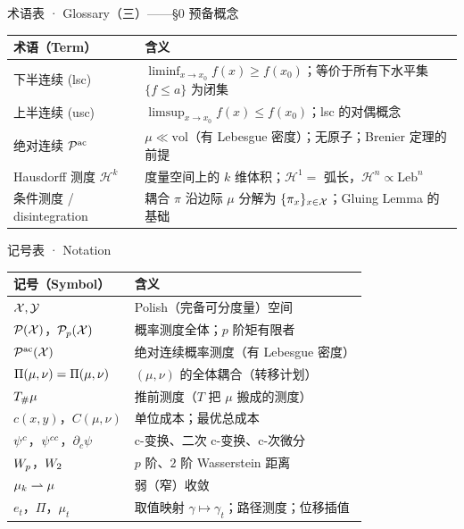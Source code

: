 \begin{frame}{术语表 · Glossary（三）——§0 预备概念}
  \begin{center}\small
  \begin{tabular}{ll}
    \toprule
    \textbf{术语（Term）} & \textbf{含义} \\
    \midrule
    下半连续 (lsc) & $\liminf_{x\to x_0}f(x)\ge f(x_0)$；等价于所有下水平集 $\{f\le a\}$ 为闭集 \\
    上半连续 (usc) & $\limsup_{x\to x_0}f(x)\le f(x_0)$；lsc 的对偶概念 \\
    绝对连续 $\mathcal{P}^{\mathrm{ac}}$ & $\mu\ll\mathrm{vol}$（有 Lebesgue 密度）；无原子；Brenier 定理的前提 \\
    Hausdorff 测度 $\mathcal{H}^{k}$ & 度量空间上的 $k$ 维体积；$\mathcal{H}^{1}=$ 弧长，$\mathcal{H}^{n}\propto\mathrm{Leb}^{n}$ \\
    条件测度 / disintegration & 耦合 $\pi$ 沿边际 $\mu$ 分解为 $\{\pi_{x}\}_{x\in\mathcal{X}}$；Gluing Lemma 的基础 \\
    \bottomrule
  \end{tabular}
  \end{center}
\end{frame}

\begin{frame}{记号表 · Notation}
  \begin{center}\small
  \begin{tabular}{ll}
    \toprule
    \textbf{记号（Symbol）} & \textbf{含义} \\
    \midrule
    $\mathcal{X},\mathcal{Y}$ & Polish（完备可分度量）空间 \\
    $\mathcal{P}(\mathcal{X})$，$\mathcal{P}_{p}(\mathcal{X})$ & 概率测度全体；$p$ 阶矩有限者 \\
    $\mathcal{P}^{\mathrm{ac}}(\mathcal{X})$ & 绝对连续概率测度（有 Lebesgue 密度）\\
    $\Pi(\mu,\nu)=\Pi(\mu,\nu)$ & $(\mu,\nu)$ 的全体耦合（转移计划） \\
    ${T}_{\#}\mu$ & 推前测度（$T$ 把 $\mu$ 搬成的测度） \\
    $c(x,y)$，$C(\mu,\nu)$ & 单位成本；最优总成本 \\
    ${\psi}^{c}$，${\psi}^{cc}$，$\partial_c\psi$ & c-变换、二次 c-变换、c-次微分 \\
    $W_{p}$，$W_{2}$ & $p$ 阶、$2$ 阶 Wasserstein 距离 \\
    $\mu_k\rightharpoonup\mu$ & 弱（窄）收敛 \\
    $e_t$，$\Pi$，$\mu_t$ & 取值映射 $\gamma\mapsto\gamma_t$；路径测度；位移插值 \\
    \bottomrule
  \end{tabular}
  \end{center}
\end{frame}

